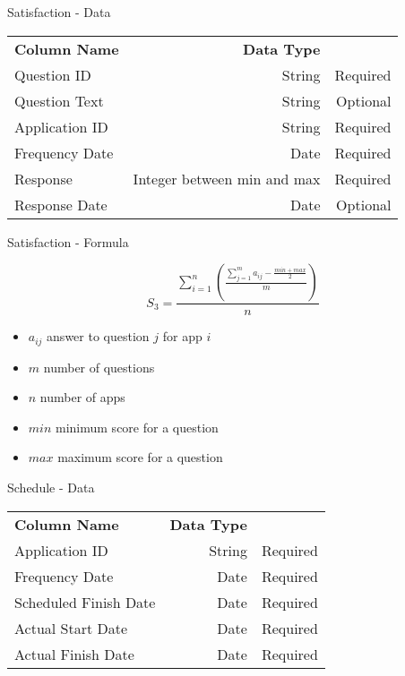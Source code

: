\begin{frame}{Satisfaction - Data}
    
    \begin{tabular}{l | r | r}
        \textbf{Column Name} & \textbf{Data Type} &  \\
        
        Question ID & String  & Required \\
        Question Text & String  & Optional \\
        Application ID & String & Required \\
        Frequency Date & Date & Required \\
        Response & Integer between min and max  & Required \\
        Response Date & Date & Optional \\
    \end{tabular}
\end{frame}

\begin{frame}{Satisfaction - Formula}
    
    \[
        S_3 = \frac{\sum^n_{i=1}\left( \frac{\sum^m_{j=1}a_{ij}- \frac{min + max}{2}}{m}  \right)}{n}
    \]
    
    \begin{itemize}
        \item $a_{i j}$ answer to question $j$ for app $i$
        \item $m$ number of questions
        \item $n$ number of apps
        \item $min$ minimum score for a question
        \item $max$ maximum score for a question
    \end{itemize}
\end{frame}

\begin{frame}{Schedule - Data}
    
    \begin{tabular}{l | r | r}
        \textbf{Column Name} & \textbf{Data Type} &  \\
        
        Application ID & String  & Required \\
        Frequency Date & Date & Required \\
        Scheduled Finish Date & Date & Required \\
        Actual Start Date & Date  & Required \\
        Actual Finish Date & Date  & Required \\
    \end{tabular}
\end{frame}

